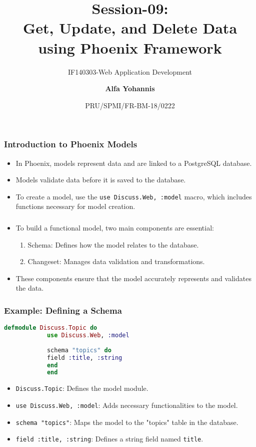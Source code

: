 \documentclass[aspectratio=169, table]{beamer}
\subtitle{IF140303-Web Application Development}
\title{Session-09:\\ \LARGE{Get, Update, and Delete Data\\using Phoenix Framework}
	\vspace{2pt}}
\date[Serial]{\scriptsize {PRU/SPMI/FR-BM-18/0222}}
\author[Pradita]{\small{\textbf{Alfa Yohannis}}}
\begin{document}
	
	\frame{\titlepage}
	\begin{frame}
		\frametitle{Introduction to Phoenix Models}
		\begin{itemize}
			\item In Phoenix, models represent data and are linked to a PostgreSQL database.
			\item Models validate data before it is saved to the database.
			\item To create a model, use the \texttt{use Discuss.Web, :model} macro, which includes functions necessary for model creation.
		\end{itemize}
	\end{frame}
	
	\begin{frame}
		\frametitle{}
		\begin{itemize}
			\item To build a functional model, two main components are essential:
			\begin{enumerate}
				\item Schema: Defines how the model relates to the database.
				\item Changeset: Manages data validation and transformations.
			\end{enumerate}
			\item These components ensure that the model accurately represents and validates the data.
		\end{itemize}
	\end{frame}
	
	\begin{frame}[fragile]
		\frametitle{Example: Defining a Schema}
		\begin{lstlisting}[language=Elixir]
			defmodule Discuss.Topic do
			use Discuss.Web, :model
			
			schema "topics" do
			field :title, :string
			end
			end
		\end{lstlisting}
		\begin{itemize}
			\item \texttt{Discuss.Topic}: Defines the model module.
			\item \texttt{use Discuss.Web, :model}: Adds necessary functionalities to the model.
			\item \texttt{schema "topics"}: Maps the model to the "topics" table in the database.
			\item \texttt{field :title, :string}: Defines a string field named \texttt{title}.
		\end{itemize}
	\end{frame}
	
\end{document}
